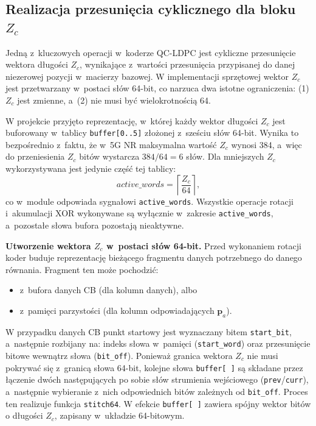 \subsection{Realizacja przesunięcia cyklicznego dla bloku $Z_c$}
\label{subsec:ldpc_enc_cyclic_shift_impl}

Jedną z~kluczowych operacji w~koderze QC-LDPC jest cykliczne przesunięcie wektora długości $Z_c$,
wynikające z~wartości przesunięcia przypisanej do danej niezerowej pozycji w~macierzy bazowej.
W implementacji sprzętowej wektor $Z_c$ jest przetwarzany w~postaci słów 64-bit, co narzuca dwa istotne ograniczenia:
(1) $Z_c$ jest zmienne, a~(2) nie musi być wielokrotnością 64.

W projekcie przyjęto reprezentację, w~której każdy wektor długości $Z_c$ jest buforowany w~tablicy
\texttt{buffer[0..5]} złożonej z~sześciu słów 64-bit. Wynika to bezpośrednio z~faktu, że w~5G NR
maksymalna wartość $Z_c$ wynosi 384, a~więc do przeniesienia $Z_c$ bitów wystarcza $384/64 = 6$ słów.
Dla mniejszych $Z_c$ wykorzystywana jest jedynie część tej tablicy:
\[
active\_words=\left\lceil \frac{Z_c}{64}\right\rceil,
\]
co w~module odpowiada sygnałowi \texttt{active\_words}. Wszystkie operacje rotacji i~akumulacji XOR wykonywane są
wyłącznie w~zakresie \texttt{active\_words}, a~pozostałe słowa bufora pozostają nieaktywne.

\medskip
\noindent\textbf{Utworzenie wektora $Z_c$ w~postaci słów 64-bit.}
Przed wykonaniem rotacji koder buduje reprezentację bieżącego fragmentu danych potrzebnego do danego równania. Fragment ten może pochodzić:
\begin{itemize}
  \item z~bufora danych CB (dla kolumn danych), albo
  \item z~pamięci parzystości (dla kolumn odpowiadających $\mathbf{p}_a$).
\end{itemize}
W przypadku danych CB punkt startowy jest wyznaczany bitem \texttt{start\_bit}, a~następnie rozbijany na:
indeks słowa w~pamięci (\texttt{start\_word}) oraz przesunięcie bitowe wewnątrz słowa (\texttt{bit\_off}).
Ponieważ granica wektora $Z_c$ nie musi pokrywać się z~granicą słowa 64-bit, kolejne słowa \texttt{buffer[ ]}
są składane przez łączenie dwóch następujących po sobie słów strumienia wejściowego
(\texttt{prev}/\texttt{curr}), a~następnie wybieranie z~nich odpowiednich bitów zależnych od \texttt{bit\_off}. Proces ten realizuje funkcja \texttt{stitch64}. W efekcie \texttt{buffer[ ]} zawiera spójny wektor bitów
o długości $Z_c$, zapisany w~układzie 64-bitowym.

